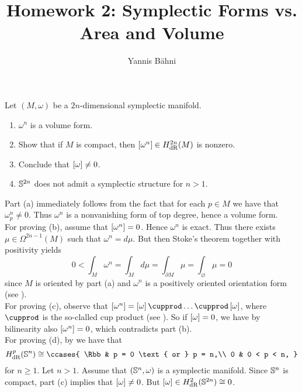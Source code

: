 

\title{Homework 2: Symplectic Forms vs. Area and Volume}
\author{Yannis B\"ahni}
\address[Yannis B\"ahni]{University of Zurich, R\"amistrasse 71, 8006 Zurich}



\maketitle
\thispagestyle{fancy}
\setcounter{section}{1}

\begin{exercise}
Let $(M,\omega)$ be a $2n$-dimensional symplectic manifold. 
\begin{enumerate}[label = \textup{(}\alph*\textup{)}]
\item $\omega^n$ is a volume form.
\item Show that if $M$ is compact, then $\sbr[0]{\omega^n} \in H_{\dRrm}^{2n}(M)$ is nonzero.
\item Conclude that $\sbr[0]{\omega} \neq 0$.
\item $\mathbb{S}^{2n}$ does not admit a symplectic structure for $n > 1$.
\end{enumerate}
\end{exercise}

\begin{solution}
	Part (a) immediately follows from the fact that for each $p \in M$ we have that $\omega_p^n \neq 0$. Thus $\omega^n$ is a nonvanishing form of top degree, hence a volume form.\\
	For proving (b), assume that $\sbr[0]{\omega^n} = 0$. Hence $\omega^n$ is exact. Thus there exists $\mu \in \Omega^{2n - 1}(M)$ such that $\omega^n = d\mu$. But then Stoke's theorem \cite[411]{lee:smooth_manifolds:2013} together with positivity \cite[407]{lee:smooth_manifolds:2013} yields
	\begin{equation*}
		0 < \int_{M} \omega^n = \int_M d\mu = \int_{\partial M} \mu	= \int_\varnothing \mu = 0
	\end{equation*}
	\noindent since $M$ is oriented by part (a) and $\omega^n$ is a positively oriented orientation form (see \cite[381]{lee:smooth_manifolds:2013}).\\
	For proving (c), observe that $\sbr[0]{\omega^n} = \sbr[0]{\omega} \cupprod \dots \cupprod \sbr[0]{\omega}$, where $\cupprod$ is the so-clalled cup product (see \cite[464]{lee:smooth_manifolds:2013}). So if $\sbr[0]{\omega} = 0$, we have by bilinearity also $\sbr[0]{\omega^n} = 0$, which contradicts part (b).\\
For proving (d), by \cite[450]{lee:smooth_manifolds:2013} we have that 
\begin{equation*}
	H_{\dRrm}^p(\Sbb^n) \cong \ccases{
		\Rbb & p = 0 \text{ or } p = n,\\
		0 & 0 < p < n,
	}
\end{equation*}
\noindent for $n \geq 1$. Let $n > 1$. Assume that $(\mathbb{S}^n, \omega)$ is a symplectic manifold. Since $\mathbb{S}^n$ is compact, part (c) implies that $\sbr[0]{\omega} \neq 0$. But $\sbr[0]{\omega} \in H_{\dRrm}^2(\Sbb^{2n}) \cong 0$.
\end{solution}

